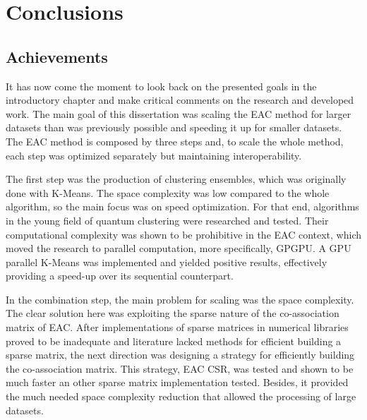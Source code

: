 
\chapter{Conclusions}
\label{chapter:conclusions}




\section{Achievements}
\label{section:achievements}

It has now come the moment to look back on the presented goals in the introductory chapter and make critical comments on the research and developed work.
The main goal of this dissertation was scaling the EAC method for larger datasets than was previously possible and speeding it up for smaller datasets.
The EAC method is composed by three steps and, to scale the whole method, each step was optimized separately but maintaining interoperability.

The first step was the production of clustering ensembles, which was originally done with K-Means.
The space complexity was low compared to the whole algorithm, so the main focus was on speed optimization.
For that end, algorithms in the young field of quantum clustering were researched and tested.
Their computational complexity was shown to be prohibitive in the EAC context, which moved the research to parallel computation, more specifically, GPGPU.
A GPU parallel K-Means was implemented and yielded positive results, effectively providing a speed-up over its sequential counterpart.

In the combination step, the main problem for scaling was the space complexity.
The clear solution here was exploiting the sparse nature of the co-association matrix of EAC.
After implementations of sparse matrices in numerical libraries proved to be inadequate and literature lacked methods for efficient building a sparse matrix, the next direction was designing a strategy for efficiently building the co-association matrix.
This strategy, EAC CSR, was tested and shown to be much faster an other sparse matrix implementation tested.
Besides, it provided the much needed space complexity reduction that allowed the processing of large datasets.

